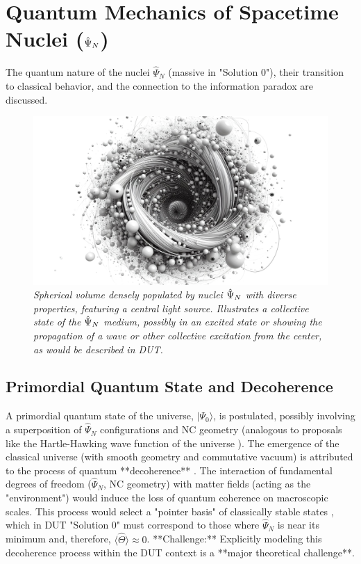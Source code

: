 \documentclass[11pt, a4paper]{article}
\theoremstyle{remark}
\newcommand{\Op}[1]{\hat{#1}}
\begin{document}
\section{Quantum Mechanics of Spacetime Nuclei (\texorpdfstring{\(\protect\Op{\Psi}_N\)}{PsiN})}
\label{sec:mecanica_cuantica_psi_n_final}

The quantum nature of the nuclei \( \Op{\Psi}_N \) (massive in "Solution 0"), their transition to classical behavior, and the connection to the information paradox are discussed.

\begin{figure}[htbp]
    \centering
    \includegraphics[width=0.6\linewidth]{OIG15.ZNLJ.PNG}
    \caption{%
        \footnotesize\textit{Spherical volume densely populated by nuclei \(\protect\Op{\Psi}_N\) with diverse properties, featuring a central light source. Illustrates a collective state of the \(\protect\Op{\Psi}_N\) medium, possibly in an excited state or showing the propagation of a wave or other collective excitation from the center, as would be described in DUT.}
    }
    \label{fig:Figura10}
\end{figure}


\subsection{Primordial Quantum State and Decoherence}
\label{sec:decoherence_final}
A primordial quantum state of the universe, \(|\Psi_0\rangle\), is postulated, possibly involving a superposition of \( \Op{\Psi}_N \) configurations and NC geometry (analogous to proposals like the Hartle-Hawking wave function of the universe \citep{HartleHawking1983WFU}). The emergence of the classical universe (with smooth geometry and commutative vacuum) is attributed to the process of quantum **decoherence** \citep{ZurekDecoherenceReview, JoosZehDecoherenceBook, KieferQuantumGravityBook}. The interaction of fundamental degrees of freedom (\( \Op{\Psi}_N \), NC geometry) with matter fields (acting as the "environment") would induce the loss of quantum coherence on macroscopic scales. This process would select a "pointer basis" of classically stable states \citep{ZurekPointerBasis, Kiefer:2008sw}, which in DUT "Solution 0" must correspond to those where \( \Op{\Psi}_N \) is near its minimum and, therefore, \( \langle \Op{\Theta} \rangle \approx 0 \).
**Challenge:** Explicitly modeling this decoherence process within the DUT context is a **major theoretical challenge**.
\end{document}
